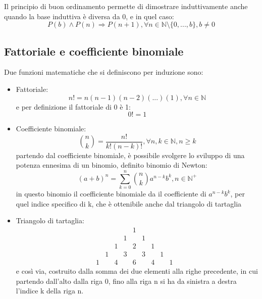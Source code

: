 \documentclass[a4paper, 12pt, openany]{book}
\begin{document}
	Il principio di buon ordinamento permette di dimostrare induttivamente anche quando la base induttiva è diversa da 0, e in quel caso:
	\[P(b) \wedge P(n) \Rightarrow P(n + 1), \forall n \in \mathbb{N}\setminus \{0, ... ,b\}, b \not = 0\]
	
	\newpage
	
	\subsection{Fattoriale e coefficiente binomiale}
	Due funzioni matematiche che si definiscono per induzione sono:
	\begin{itemize}
		\item Fattoriale:
		\[n! = n(n-1)(n-2)(...)(1), \forall n \in \mathbb{N}\]
		e per definizione il fattoriale di 0 è 1:
		\[0! = 1\]
		\item Coefficiente binomiale:
		\[\binom{n}{k} = \frac{n!}{k!(n-k)!}, \forall n,k \in \mathbb{N}, n \geq k\]
		partendo dal coefficiente binomiale, è possibile svolgere lo sviluppo di una potenza ennesima di un binomio, definito binomio di Newton:
		\[(a+b)^n = \sum_{k = 0}^{n} \binom{n}{k} a^{n-k}b^k, n\in \mathbb{N}^+\]
		in questo binomio il coefficiente binomiale da il coefficiente di $a^{n-k}b^k$, per quel indice specifico di k, che è ottenibile anche dal triangolo di tartaglia
		\item Triangolo di tartaglia:
		\[
		\begin{array}{ccccccccccc}
			&&&&1&&&\\
			&&&1&&1&&\\
			&&1&&2&&1&\\
			&1&&3&&3&&1\\
			1&&4&&6&&4&&1&
		\end{array}
		\]
		e così via, costruito dalla somma dei due elementi alla righe precedente, in cui partendo dall'alto dalla riga 0, fino alla riga n si ha da sinistra a destra l'indice k della riga n.
	\end{itemize}
	
\end{document}
